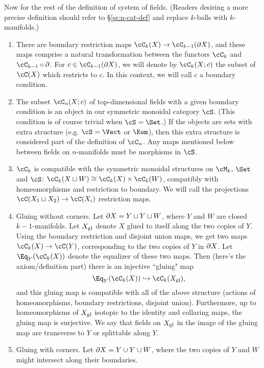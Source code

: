 Now for the rest of the definition of system of fields.
(Readers desiring a more precise definition should refer to \S\ref{ss:n-cat-def}
and replace $k$-balls with $k$-manifolds.)
\begin{enumerate}
\item There are boundary restriction maps $\cC_k(X) \to \cC_{k-1}(\bd X)$, 
and these maps comprise a natural
transformation between the functors $\cC_k$ and $\cC_{k-1}\circ\bd$.
For $c \in \cC_{k-1}(\bd X)$, we will denote by $\cC_k(X; c)$ the subset of 
$\cC(X)$ which restricts to $c$.
In this context, we will call $c$ a boundary condition.
\item The subset $\cC_n(X;c)$ of top-dimensional fields 
with a given boundary condition is an object in our symmetric monoidal category $\cS$.
(This condition is of course trivial when $\cS = \Set$.) 
If the objects are sets with extra structure (e.g. $\cS = \Vect$ or $\Kom$), 
then this extra structure is considered part of the definition of $\cC_n$.
Any maps mentioned below between fields on $n$-manifolds must be morphisms in $\cS$.
\item $\cC_k$ is compatible with the symmetric monoidal
structures on $\cM_k$, $\Set$ and $\cS$: $\cC_k(X \du W) \cong \cC_k(X)\times \cC_k(W)$,
compatibly with homeomorphisms and restriction to boundary.
We will call the projections $\cC(X_1 \du X_2) \to \cC(X_i)$
restriction maps.
\item Gluing without corners.
Let $\partial X = Y \sqcup Y \sqcup W$, where $Y$ and $W$ are closed $k{-}1$-manifolds.
Let $X_\mathrm{gl}$ denote $X$ glued to itself along the two copies of $Y$.
Using the boundary restriction and disjoint union
maps, we get two maps $\cC_k(X) \to \cC(Y)$, corresponding to the two
copies of $Y$ in $\partial X$.
Let $\Eq_Y(\cC_k(X))$ denote the equalizer of these two maps.
Then (here's the axiom/definition part) there is an injective ``gluing" map
\[
	\Eq_Y(\cC_k(X)) \hookrightarrow \cC_k(X\sgl) ,
\]
and this gluing map is compatible with all of the above structure (actions
of homeomorphisms, boundary restrictions, disjoint union).
Furthermore, up to homeomorphisms of $X_\mathrm{gl}$ isotopic to the identity 
and collaring maps,
the gluing map is surjective.
We say that fields on $X_\mathrm{gl}$ in the image of the gluing map
are transverse to $Y$ or splittable along $Y$.
\item Gluing with corners.
Let $\partial X = Y \cup Y \cup W$, where the two copies of $Y$ and 
$W$ might intersect along their boundaries. 

\end{enumerate}
